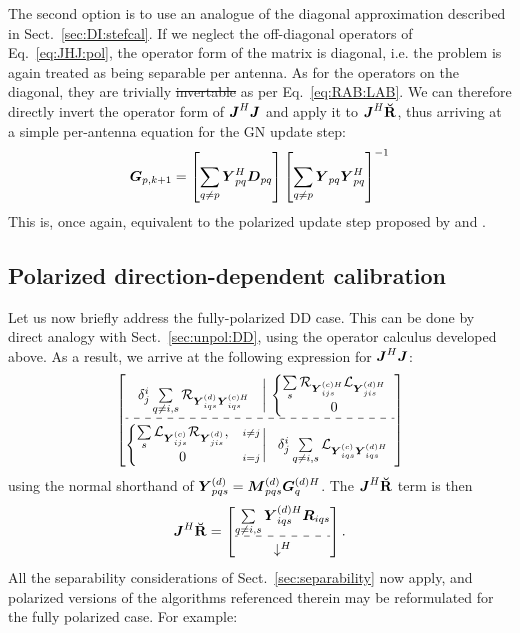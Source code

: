 \documentclass[useAMS,usenatbib]{mn2e}
\makeatletter
\newcommand{\mat}[1]{{\bmath{#1}}}
\newcommand{\JJ}{\mat{J}} %
\newcommand{\DD}{\mat{D}}
\newcommand{\RR}{\mat{R}}
\newcommand{\GG}{\mat{G}}
\newcommand{\JHJ}{\JJ^H\JJ} %
\newcommand{\Matrix}[2]{\left [ \begin{array}{@{}#1@{}}#2\end{array} \right ]}
\newcommand{\AUGx}[1]{\mathbf{\breve{#1}}}
\newcommand{\RRr}{\AUGx{R}}
\newcommand{\Rop}[1]{\mathcal{R}_{{#1}}}
\newcommand{\Lop}[1]{\mathcal{L}_{{#1}}}
\newcommand{\StefCal}{{\sc StefCal}}
\numberwithin{equation}{section}
\providecommand{\DIFadd}[1]{{\protect\color{blue}\uwave{#1}}} %
\providecommand{\DIFdel}[1]{{\protect\color{red}\sout{#1}}}                      %
\providecommand{\DIFaddbegin}{} %
\providecommand{\DIFaddend}{} %
\providecommand{\DIFdelbegin}{} %
\providecommand{\DIFdelend}{} %
\makeatother
\begin{document}
The second option is to use an analogue of the diagonal approximation described in Sect.~\ref{sec:DI:stefcal}. If we 
neglect the off-diagonal operators of Eq.~\ref{eq:JHJ:pol}, the operator form of the matrix is diagonal, i.e. the problem 
is again treated as being separable per antenna. As for the operators on the diagonal, they are trivially \DIFdelbegin \DIFdel{invertable }\DIFdelend \DIFaddbegin \DIFadd{invertible }\DIFaddend as per 
Eq.~\ref{eq:RAB:LAB}. We can therefore directly invert the operator form
of $\JHJ$ and apply it to $\JJ^H\RRr$, thus arriving at a simple per-antenna equation  for the GN update step:
\begin{equation}
\label{eq:update:DI:diag:pol}
\GG_{p,k+1} =  
\left [ \sum\limits_{q\ne p} \YY^H_{pq} \DD_{pq} \right ] 
\left [ \sum\limits_{q\ne p} \YY_{pq} \YY^H_{pq}  \right ]^{-1}
\end{equation}
This is, once again, equivalent to the polarized {\sc \StefCal} update step proposed by \citet{OMS-Stefcal} and \citet{Stefcal}.




\subsection{Polarized direction-dependent calibration}

Let us now briefly address the fully-polarized DD case. This can be done by direct analogy with
Sect.~\ref{sec:unpol:DD}, using the operator calculus developed above. As a result, we arrive at the
following expression for $\JHJ$:
\begin{equation}
\label{eq:JHJ:DD:pol}
  \JHJblocksFull{
  \delta^i_j \sum\limits_{q\ne i,s} \Rop{\YYd_{iqs} \YYcH_{iqs}} 
  }{
  \left \{ 
  \begin{array}{@{}c}
   \sum\limits_{s} \Rop{ \YYcH_{ijs}  } \Lop{\YYdH_{jis}} \\
   0
  \end{array} \right . 
  }{
  \left \{ 
  \begin{array}{@{}cc@{}}
   \sum\limits_{s} \Lop{ \YYc_{ijs}  } \Rop{\YYd_{jis}},&{\scriptstyle i\ne j} \\
   0 &{\scriptstyle i=j}
  \end{array} \right . 
  }{ 
  \delta^i_j \sum\limits_{q\ne i,s} \Lop{\YYc_{iqs} \YYdH_{iqs}} 
  }
\end{equation}
using the normal shorthand of $\YYd_{pqs} = \MMd_{pqs} \GGdH_q$. The $\JJ^H\RRr$ term is then
\newcommand{\CCC}{\mathcal{C}}
\begin{equation}
\label{eq:JHR:DD:pol}
\JJ^H\RRr = \Matrix{c}{
\sum\limits_{q\ne i,s} \YYdH_{iqs} \RR_{iqs} \\
\hdashline\\[-8pt]
\downarrow^H}.
\end{equation}
All the separability considerations of Sect.~\ref{sec:separability} now apply, and polarized versions of the 
algorithms referenced therein may be reformulated for the fully polarized case. For example:
\end{document}

